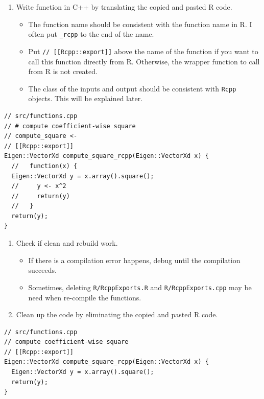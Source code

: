\documentclass[
]{book}
\providecommand{\tightlist}{%
  \setlength{\itemsep}{0pt}\setlength{\parskip}{0pt}}
\begin{document}
\begin{enumerate}
\def\labelenumi{\arabic{enumi}.}
\setcounter{enumi}{7}
\tightlist
\item
  Write function in C++ by translating the copied and pasted R code.

  \begin{itemize}
  \tightlist
  \item
    The function name should be consistent with the function name in R. I often put \texttt{\_rcpp} to the end of the name.
  \item
    Put \texttt{//\ {[}{[}Rcpp::export{]}{]}} above the name of the function if you want to call this function directly from R. Otherwise, the wrapper function to call from R is not created.
  \item
    The class of the inputs and output should be consistent with \texttt{Rcpp} objects. This will be explained later.
  \end{itemize}
\end{enumerate}

\begin{verbatim}
// src/functions.cpp
// # compute coefficient-wise square
// compute_square <-
// [[Rcpp::export]]
Eigen::VectorXd compute_square_rcpp(Eigen::VectorXd x) {
  //   function(x) {
  Eigen::VectorXd y = x.array().square();
  //     y <- x^2
  //     return(y)
  //   }
  return(y);
}
\end{verbatim}

\begin{enumerate}
\def\labelenumi{\arabic{enumi}.}
\setcounter{enumi}{8}
\tightlist
\item
  Check if clean and rebuild work.

  \begin{itemize}
  \tightlist
  \item
    If there is a compilation error happens, debug until the compilation succeeds.
  \item
    Sometimes, deleting \texttt{R/RcppExports.R} and \texttt{R/RcppExports.cpp} may be need when re-compile the functions.
  \end{itemize}
\item
  Clean up the code by eliminating the copied and pasted R code.
\end{enumerate}

\begin{verbatim}
// src/functions.cpp
// compute coefficient-wise square
// [[Rcpp::export]]
Eigen::VectorXd compute_square_rcpp(Eigen::VectorXd x) {
  Eigen::VectorXd y = x.array().square();
  return(y);
}
\end{verbatim}
\end{document}
